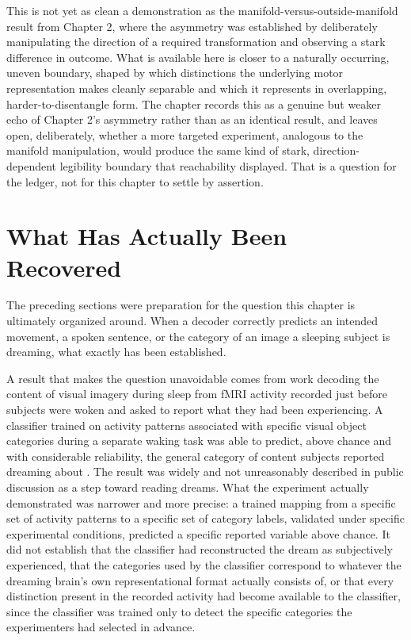 \documentclass[11pt]{book}
\begin{document}
This is not yet as clean a demonstration as the manifold-versus-outside-manifold result from Chapter 2, where the asymmetry was established by deliberately manipulating the direction of a required transformation and observing a stark difference in outcome. What is available here is closer to a naturally occurring, uneven boundary, shaped by which distinctions the underlying motor representation makes cleanly separable and which it represents in overlapping, harder-to-disentangle form. The chapter records this as a genuine but weaker echo of Chapter 2's asymmetry rather than as an identical result, and leaves open, deliberately, whether a more targeted experiment, analogous to the manifold manipulation, would produce the same kind of stark, direction-dependent legibility boundary that reachability displayed. That is a question for the ledger, not for this chapter to settle by assertion.

\section{What Has Actually Been Recovered}

The preceding sections were preparation for the question this chapter is ultimately organized around. When a decoder correctly predicts an intended movement, a spoken sentence, or the category of an image a sleeping subject is dreaming, what exactly has been established.

A result that makes the question unavoidable comes from work decoding the content of visual imagery during sleep from fMRI activity recorded just before subjects were woken and asked to report what they had been experiencing. A classifier trained on activity patterns associated with specific visual object categories during a separate waking task was able to predict, above chance and with considerable reliability, the general category of content subjects reported dreaming about \cite{horikawa2013}. The result was widely and not unreasonably described in public discussion as a step toward reading dreams. What the experiment actually demonstrated was narrower and more precise: a trained mapping from a specific set of activity patterns to a specific set of category labels, validated under specific experimental conditions, predicted a specific reported variable above chance. It did not establish that the classifier had reconstructed the dream as subjectively experienced, that the categories used by the classifier correspond to whatever the dreaming brain's own representational format actually consists of, or that every distinction present in the recorded activity had become available to the classifier, since the classifier was trained only to detect the specific categories the experimenters had selected in advance.
\end{document}
